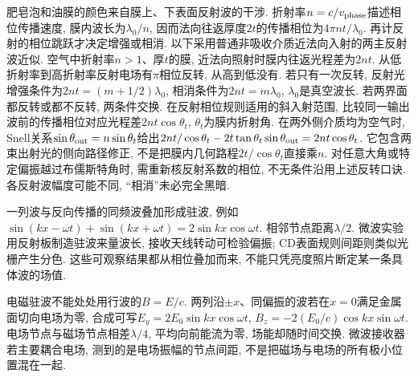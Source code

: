肥皂泡和油膜的颜色来自膜上、下表面反射波的干涉. 折射率$n=c/v_{\rm phase}$描述相位传播速度, 膜内波长为$\lambda_0/n$, 因而法向往返厚度$2t$的传播相位为$4\pi nt/\lambda_0$. 再计反射的相位跳跃才决定增强或相消. 以下采用普通非吸收介质近法向入射的两主反射波近似. 空气中折射率$n>1$、厚$t$的膜, 近法向照射时膜内往返光程差为$2nt$. 从低折射率到高折射率反射电场有$\pi$相位反转, 从高到低没有. 若只有一次反转, 反射光增强条件为$2nt=(m+1/2)\lambda_0$, 相消条件为$2nt=m\lambda_0$, $\lambda_0$是真空波长. 若两界面都反转或都不反转, 两条件交换. 在反射相位规则适用的斜入射范围, 比较同一输出波前的传播相位对应光程差$2nt\cos\theta_t$, $\theta_t$为膜内折射角. 在两外侧介质均为空气时, Snell关系$\sin\theta_{\rm out}=n\sin\theta_t$给出$2nt/\cos\theta_t-2t\tan\theta_t\sin\theta_{\rm out}=2nt\cos\theta_t$. 它包含两束出射光的侧向路径修正, 不是把膜内几何路程$2t/\cos\theta_t$直接乘$n$. 对任意大角或特定偏振越过布儒斯特角时, 需重新核反射系数的相位, 不无条件沿用上述反转口诀. 各反射波幅度可能不同, “相消”未必完全黑暗.

一列波与反向传播的同频波叠加形成驻波, 例如$\sin(kx-\omega t)+\sin(kx+\omega t)=2\sin kx\cos\omega t$. 相邻节点距离$\lambda/2$. 微波实验用反射板制造驻波来量波长, 接收天线转动可检验偏振; CD表面规则间距则类似光栅产生分色. 这些可观察结果都从相位叠加而来, 不能只凭亮度照片断定某一条具体波的场值.


电磁驻波不能处处用行波的$B=E/c$. 两列沿$\pm x$、同偏振的波若在$x=0$满足金属面切向电场为零, 合成可写$E_y=2E_0\sin kx\cos\omega t$, $B_z=-2(E_0/c)\cos kx\sin\omega t$. 电场节点与磁场节点相差$\lambda/4$, 平均向前能流为零, 场能却随时间交换. 微波接收器若主要耦合电场, 测到的是电场振幅的节点间距, 不是把磁场与电场的所有极小位置混在一起.
